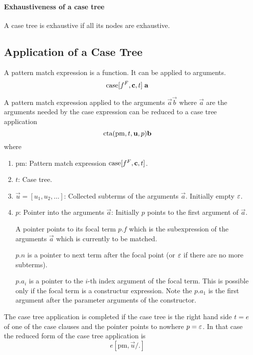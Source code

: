 \paragraph{Exhaustiveness of a case tree}
%
A case tree is exhaustive if all its nodes are exhaustive.






\subsection{Application of a Case Tree}

A pattern match expression is a function. It can be applied to arguments.
$$
    {\text{case}} [f^F, {\mathbf c}, t]\; {\mathbf a}
$$

A pattern match expression applied to the arguments $\vec a \vec b$ where $\vec
a$ are the arguments needed by the case expression can be reduced to a case tree
application
$$
    {\text{cta}}(\text{pm}, t, {\mathbf u}, p) {\mathbf b}
$$
where
\begin{enumerate}
    \item $\text{pm}$: Pattern match expression ${\text{case}}[f^F, {\mathbf c}, t]$.

    \item $t$: Case tree.

    \item $\vec u = [u_1, u_2, \ldots]$: Collected subterms of the arguments
        $\vec a$. Initially empty $\varepsilon$.

    \item $p$: Pointer into the arguments $\vec a$: Initially $p$ points to the
        first argument of $\vec a$.

        A pointer points to its
        focal term $p.f$ which is the subexpression of the arguments $\vec a$
        which is currently to be matched.

        $p.n$ is a pointer to next term after the
        focal point (or $\varepsilon$ if there are no more subterms).

        $p.a_i$ is a pointer to the $i$-th index argument of the focal term.
        This is possible only if the focal term is a constructur expression.
        Note the $p.a_1$ is the first argument after the parameter arguments of
        the constructor.
\end{enumerate}

The case tree application is completed if the case tree is the right hand side
$t = e$ of one of the case clauses and the pointer points to nowhere $p =
\varepsilon$. In that case the reduced form of the case tree application is
$$
    e[\text{pm}, \vec u/ .]
$$

